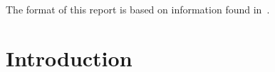 \documentclass[pdf,ps2pdf,11pt]{SANDreport}
\begin{document}
The format of this report is based on information found
in~\cite{Sand98-0730}.

%
\clearpage
\tableofcontents
\listoffigures




%
\SANDmain %

\section{Introduction}
\end{document}
